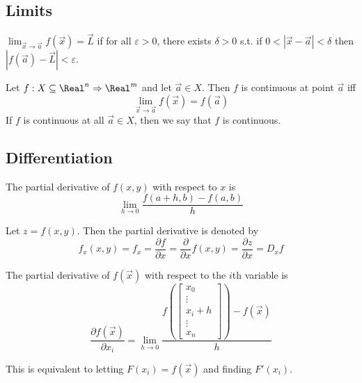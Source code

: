 \subsection{Limits}


\begin{definition}[Limit]
  $\lim_{\vec{x} \to \vec{a}} f(\vec{x}) = \vec{L}$ if for all $\varepsilon > 0$, there exists $\delta > 0$ s.t. if $0 < |\vec{x} - \vec{a}| < \delta$ then $|f(\vec{a}) - \vec{L}| < \varepsilon$.
\end{definition}

\begin{definition}[Continuity]
  Let $f : X \subseteq \Real^n \Rightarrow \Real^m$ and let $\vec{a} \in X$. Then $f$ is continuous at point $\vec{a}$ iff
  \[
    \lim_{\vec{x} \to \vec{a}} f(\vec{x}) = f(\vec{a})
  \]
  If $f$ is continuous at all $\vec{a} \in X$, then we say that $f$ is continuous.
\end{definition}

\subsection{Differentiation}


\begin{definition}
  The partial derivative of $f(x, y)$ with respect to $x$ is
  \[
    \lim_{h \to 0} \frac{f(a + h, b) - f(a, b)}{h}
  \]

  Let $z = f(x, y)$. Then the partial derivative is denoted by
  \[
    f_x(x, y) = f_x = \frac{\partial f}{\partial x} = \frac{\partial}{\partial x} f(x, y) = \frac{\partial z}{\partial x} = D_x f
  \]
\end{definition}

\begin{definition}
  The partial derivative of $f(\vec{x})$ with respect to the $i$th variable is
  \[
    \frac{\partial f(\vec{x})}{\partial x_i} = \lim_{h \to 0} \frac{f\left(\begin{bmatrix}
      x_0 \\
      \vdots \\
      x_i + h \\
      \vdots \\
      x_n
    \end{bmatrix}\right) - f\left(\vec{x}\right)}{h}
  \]

  This is equivalent to letting $F(x_i) = f(\vec{x})$ and finding $F'(x_i)$.
\end{definition}

